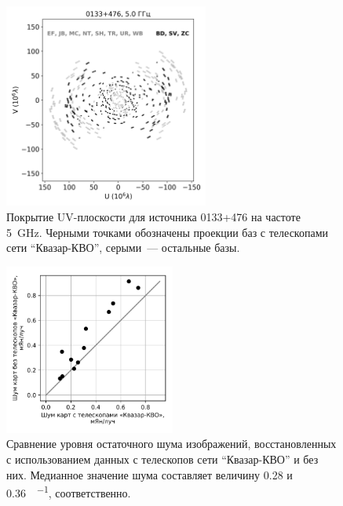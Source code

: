 \begin{figure}
 \centering
 \includegraphics[width=0.6\textwidth]{uv_plot.png}
 \caption{Покрытие UV-плоскости для источника 0133+476 на частоте \SI{5}{\giga\hertz}. Черными точками
обозначены проекции баз с телескопами сети ``Квазар-КВО'', серыми~--- остальные базы.}
 \label{fig:uv}
\end{figure}

\begin{figure}
 \centering
 \includegraphics[width=0.5\textwidth]{rms_plot.pdf}
 \caption{Сравнение уровня остаточного шума изображений, восстановленных с использованием данных с
          телескопов сети ``Квазар-КВО'' и без них. Медианное значение шума составляет
          величину \num{0.28} и \SI{0.36}{\jansky\per\beam}, соответственно.}
 \label{fig:map_rms}
\end{figure}

